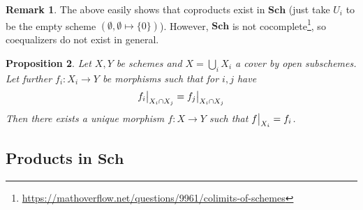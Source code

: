 \documentclass{scrartcl}
\newcommand{\Sch}{\mathrm{\textbf{Sch}}}
\newcommand\restr[2]{{
    \left.\kern-\nulldelimiterspace
    #1
    \vphantom{\big|}
    \right|_{#2}
}}
\newtheorem{prop}{Proposition}[section]
\theoremstyle{definition}
\newtheorem{remark}[prop]{Remark}
\begin{document}
\begin{remark}
    The above easily shows that coproducts exist in $\Sch$ (just take $U_i$ to be the empty scheme $(\emptyset, \emptyset \mapsto \{0\})$).
    However, $\Sch$ is not cocomplete\footnote{\href{https://mathoverflow.net/questions/9961/colimits-of-schemes}{https://mathoverflow.net/questions/9961/colimits-of-schemes}}, so coequalizers do not exist in general.
\end{remark}
\begin{prop}
    Let $X, Y$ be schemes and $X = \bigcup_i X_i$ a cover by open subschemes.
    Let further $f_i: X_i \to Y$ be morphisms such that for $i, j$ have
    \begin{equation*}
        \restr{f_i}{X_i \cap X_j} = \restr{f_j}{X_i \cap X_j}
    \end{equation*}
    Then there exists a unique morphism $f: X \to Y$ such that $\restr{f}{X_i} = f_i$.
\end{prop}

\subsection{Products in $\Sch$}
\end{document}
